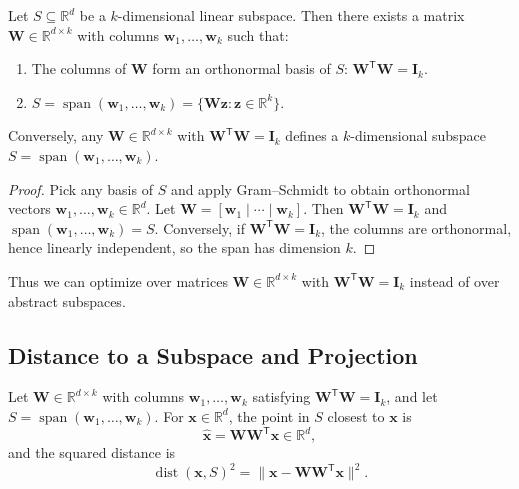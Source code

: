 \begin{lemma}\label{lem:subspace-parametrization}
  Let $S \subseteq \mathbb{R}^d$ be a $k$-dimensional linear subspace. Then there exists a matrix $\mathbf{W} \in \mathbb{R}^{d \times k}$ with columns $\mathbf{w}_1,\dots,\mathbf{w}_k$ such that:
  \begin{enumerate}
    \item The columns of $\mathbf{W}$ form an orthonormal basis of $S$: $\mathbf{W}^{\mathsf{T}}\mathbf{W} = \mathbf{I}_k$.
    \item $S = \operatorname{span}(\mathbf{w}_1,\dots,\mathbf{w}_k) = \{\mathbf{W}\mathbf{z} : \mathbf{z} \in \mathbb{R}^k\}$.
  \end{enumerate}
  Conversely, any $\mathbf{W} \in \mathbb{R}^{d \times k}$ with $\mathbf{W}^{\mathsf{T}}\mathbf{W} = \mathbf{I}_k$ defines a $k$-dimensional subspace $S = \operatorname{span}(\mathbf{w}_1,\dots,\mathbf{w}_k)$.
\end{lemma}

\begin{proof}
  Pick any basis of $S$ and apply Gram--Schmidt to obtain orthonormal vectors $\mathbf{w}_1,\dots,\mathbf{w}_k \in \mathbb{R}^d$.
  Let $\mathbf{W} = [\mathbf{w}_1 \mid \cdots \mid \mathbf{w}_k]$. Then $\mathbf{W}^{\mathsf{T}}\mathbf{W} = \mathbf{I}_k$ and $\operatorname{span}(\mathbf{w}_1,\dots,\mathbf{w}_k) = S$.
  Conversely, if $\mathbf{W}^{\mathsf{T}}\mathbf{W} = \mathbf{I}_k$, the columns are orthonormal, hence linearly independent, so the span has dimension $k$.
\end{proof}

Thus we can optimize over matrices $\mathbf{W} \in \mathbb{R}^{d \times k}$ with $\mathbf{W}^{\mathsf{T}}\mathbf{W} = \mathbf{I}_k$ instead of over abstract subspaces.

\subsection{Distance to a Subspace and Projection}

\begin{lemma}\label{lem:projection-formula}
  Let $\mathbf{W} \in \mathbb{R}^{d \times k}$ with columns $\mathbf{w}_1,\dots,\mathbf{w}_k$ satisfying $\mathbf{W}^{\mathsf{T}}\mathbf{W} = \mathbf{I}_k$, and let $S = \operatorname{span}(\mathbf{w}_1,\dots,\mathbf{w}_k)$.
  For $\mathbf{x} \in \mathbb{R}^d$, the point in $S$ closest to $\mathbf{x}$ is
  \begin{equation}\label{eq:projection}
    \widehat{\mathbf{x}} = \mathbf{W}\mathbf{W}^{\mathsf{T}}\mathbf{x} \in \mathbb{R}^d,
  \end{equation}
  and the squared distance is
  \begin{equation}
    \operatorname{dist}(\mathbf{x}, S)^2 = \|\mathbf{x} - \mathbf{W}\mathbf{W}^{\mathsf{T}}\mathbf{x}\|^2.
  \end{equation}
\end{lemma}

